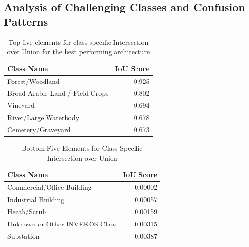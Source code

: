 \documentclass{report}
\begin{document}
\subsection{Analysis of Challenging Classes and Confusion Patterns}

\begin{table}[H]
\centering
\caption{Top five elements for class-specific Intersection over Union for the best performing architecture}
\label{tab:class_specific_iou_best}
\begin{tabular}{lr}
\toprule
Class Name & IoU Score \\
\midrule
Forest/Woodland & 0.925 \\
Broad Arable Land / Field Crops & 0.802 \\
Vineyard & 0.694 \\
River/Large Waterbody & 0.678 \\
Cemetery/Graveyard & 0.673 \\
\bottomrule
\end{tabular}
\end{table}


\begin{table}[H]
\centering
\caption{Bottom Five Elements for Class Specific Intersection over Union}
\label{tab:class_specific_iou_worst}
\begin{tabular}{lr}
\toprule
Class Name & IoU Score \\
\midrule
Commercial/Office Building & 0.00002 \\
Industrial Building & 0.00057 \\
Heath/Scrub & 0.00159 \\
Unknown or Other INVEKOS Class & 0.00315 \\
Substation & 0.00387 \\
\bottomrule
\end{tabular}
\end{table}
\end{document}
